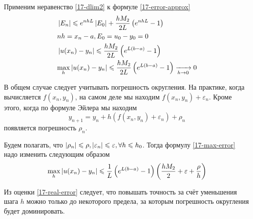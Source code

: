 Применим неравенство \eqref{17-dlim2} к формуле \eqref{17-error-approx}
\begin{align}
  &\left\lvert E_n \right\rvert \leqslant e^{nhL}\left\lvert E_0 \right\rvert + \dfrac{hM_2}{2L}
  \left(e^{nhL} - 1\right)\\
  \nonumber
  &nh = x_n - a, E_0 = u_0 - y_0 = 0\\
  &\left\lvert u(x_n) - y_n \right\rvert \leqslant \dfrac{hM_2}{2L}\left(e^{L(b - a)} - 1\right)\\
  \label{17-max-error}
  &\underset{h}\max\left\lvert u(x_n) - y_n \right\rvert \leqslant \dfrac{hM_2}{2L}
  \left(e^{L(b - a)} - 1\right) \xrightarrow[h \to 0]{} 0
\end{align}

В общем случае следует учитывать погрешность округления. На практике, когда
вычисляется $f(x_n, y_n)$, на самом деле мы находим $f(x_n, y_n) + \varepsilon_n$.
Кроме этого, когда по формуле Эйлера мы находим
\begin{equation}
  y_{n + 1} = y_n + h(f(x_n, y_n) + \varepsilon_n) + \rho_n
\end{equation}
появляется погрешность $\rho_n$.

Будем полагать, что $\left\lvert \rho_n \right\rvert \leqslant \rho, \left\lvert \varepsilon_n \right\rvert \leqslant
\varepsilon, \forall h \leqslant h_0$. Тогда формулу \eqref{17-max-error}
надо изменить следующим образом
\begin{equation}
  \label{17-real-error}
  \underset{h}\max\left\lvert u(x_n) - y_n \right\rvert \leqslant \dfrac{1}{L}
  \left(e^{L(b - a)} - 1\right)\left(\dfrac{hM_2}{2} + \varepsilon +
  \dfrac{\rho}{h}\right)
\end{equation}

Из оценки \eqref{17-real-error} следует, что повышать точность за счёт уменьшения
шага $h$ можно только до некоторого предела, за которым погрешность округления
будет доминировать.
